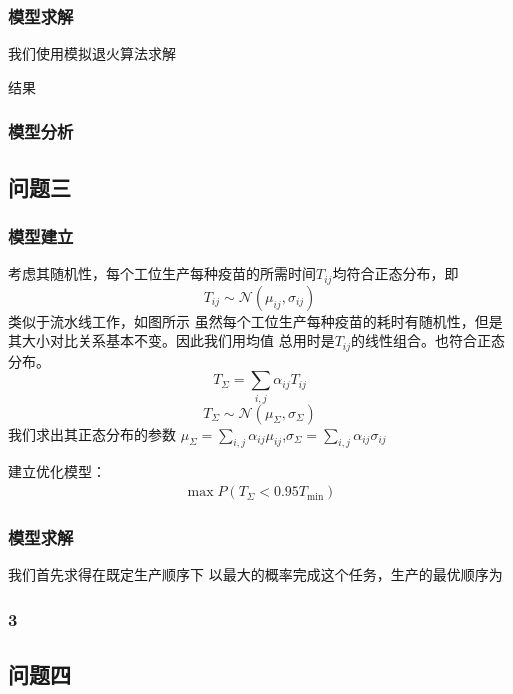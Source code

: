 \documentclass[UTF8]{ctexart}
\begin{document}
	\subsubsection{模型求解}
	我们使用模拟退火算法求解
	\par 结果
	\subsubsection{模型分析}
	
	\subsection{问题三}
	\subsubsection{模型建立}
	考虑其随机性，每个工位生产每种疫苗的所需时间$T_{ij}$均符合正态分布，即
	\begin{equation}
		T_{ij}\sim\mathcal{N}(\mu_{ij},\sigma_{ij})
	\end{equation}
	类似于流水线工作，如图所示
	虽然每个工位生产每种疫苗的耗时有随机性，但是其大小对比关系基本不变。因此我们用均值
	总用时是$T_{ij}$的线性组合。也符合正态分布。
	\begin{equation}
		T_{\Sigma}=\sum_{i,j}\alpha_{ij}T_{ij}
	\end{equation}
	\begin{equation}
		T_{\Sigma}\sim\mathcal{N}(\mu_{\Sigma},\sigma_{\Sigma})
	\end{equation}
	我们求出其正态分布的参数
	$\mu_{\Sigma}=\sum_{i,j}\alpha_{ij}\mu_{ij}$,$\sigma_{\Sigma}=\sum_{i,j}\alpha_{ij}\sigma_{ij}$
	\par 建立优化模型：
	\begin{equation}
	\begin{split}
		\max P(T_{\Sigma}<0.95T_{\min})
	\end{split}
	\end{equation}
	\subsubsection{模型求解}
	我们首先求得在既定生产顺序下
	以最大的概率完成这个任务，生产的最优顺序为
	\subsubsection{3}
	
	\subsection{问题四}
\end{document}
